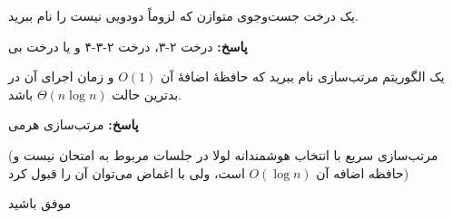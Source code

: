 \documentclass[12pt, a4paper]{article}
\newcommand{\پاسخ}[2]{\color{answercolor}\textbf{پاسخ: }#2\color{black}\vspace{-0.3cm}}
\begin{document}
یک درخت جست‌وجوی متوازن که لزوماً دودویی نیست را نام ببرید.

\پاسخ{\vspace{0.5cm}}{
درخت ۲-۳، درخت ۲-۳-۴ و یا درخت بی

}

یک الگوریتم مرتب‌سازی نام ببرید که حافظۀ اضافۀ آن $O(1)$ و زمان اجرای آن در بدترین حالت $\Theta(n\log n)$ باشد.

\پاسخ{\vspace{0.5cm}}{
مرتب‌سازی هرمی

(مرتب‌سازی سریع با انتخاب هوشمندانه لولا در جلسات مربوط به امتحان نیست و حافظه اضافه آن $O(\log n)$ است، ولی با اغماض می‌توان آن را قبول کرد)
	
}

\begin{flushleft}
موفق باشید
\end{flushleft}
\end{document}
